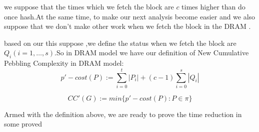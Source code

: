 we suppose that the times which we fetch the block are $c$ times higher than do once hash.At the same time, to make our next analysis become easier and we also suppose that we don't make other work when we fetch the block in the DRAM .
\begin{definition}\label{def::cumulativecomplexity}
based on our this suppose ,we define the status when we fetch the block are $Q_i(i=1,\dots,s)$.So in DRAM model we have our definition of New Cumulative Pebbling Complexity in DRAM model:
  \begin{equation}
    p'-cost(P):= \sum\limits_{i=0}^t|P_i|+(c-1)\sum\limits_{i=0}^s|Q_i|
  \end{equation}

  \begin{equation}
    CC'(G):= min\{p'-cost(P):P \in \pi \}
  \end{equation}
\end{definition}


Armed with the definition above, we are ready to prove the time reduction in some proved
